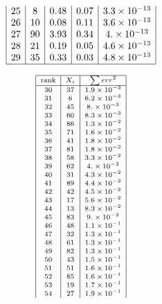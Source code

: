 {\begin{table}[!hb]
\begin{minipage}[t]{.4\linewidth}
\[\begin{array}{|c|c|c|c|c|}
 25 & 8 & 0.48 & 0.07 & 3.3\times 10^{-13} \\
 26 & 10 & 0.08 & 0.11 & 3.6\times 10^{-13} \\
 27 & 90 & 3.93 & 0.34 & 4.\times 10^{-13} \\
 28 & 21 & 0.19 & 0.05 & 4.6\times 10^{-13} \\
 29 & 35 & 0.33 & 0.03 & 4.8\times 10^{-13} \\
\hline
\end{array} \]
\end{minipage}%
\begin{minipage}[t]{.3\linewidth}
\centering
\[ \scriptsize
\begin{array}{|c|c|c|}
\hline
 \text{rank} & %
 X_i & \sum{err^2} \\
 \hline
 30 & 37 & 1.9\times 10^{-3} \\
 31 & 6 & 6.2\times 10^{-3} \\
 32 & 45 & 8.\times 10^{-3} \\
 33 & 60 & 8.3\times 10^{-3} \\
 34 & 86 & 1.3\times 10^{-2} \\
 35 & 71 & 1.6\times 10^{-2} \\
 36 & 41 & 1.8\times 10^{-2} \\
 37 & 81 & 1.8\times 10^{-2} \\
 38 & 58 & 3.3\times 10^{-2} \\
 39 & 62 & 4.\times 10^{-2} \\
 40 & 31 & 4.3\times 10^{-2} \\
 41 & 89 & 4.4\times 10^{-2} \\
 42 & 42 & 4.5\times 10^{-2} \\
 43 & 17 & 5.6\times 10^{-2} \\
 44 & 13 & 8.3\times 10^{-2} \\
 45 & 83 & 9.\times 10^{-2} \\
 46 & 48 & 1.1\times 10^{-1} \\
 47 & 32 & 1.3\times 10^{-1} \\
 48 & 61 & 1.3\times 10^{-1} \\
 49 & 82 & 1.3\times 10^{-1} \\
 50 & 43 & 1.5\times 10^{-1} \\
 51 & 51 & 1.6\times 10^{-1} \\
 52 & 85 & 1.6\times 10^{-1} \\
 53 & 19 & 1.7\times 10^{-1} \\
 54 & 27 & 1.9\times 10^{-1} \\

\end{array}\]
\end{minipage}
\end{table}}

